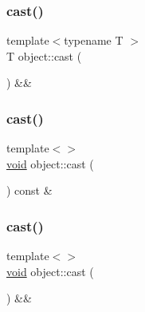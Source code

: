 \subsubsection{\texorpdfstring{cast()}{cast()}\hspace{0.1cm}{\footnotesize\ttfamily [4/6]}}
{\footnotesize\ttfamily template$<$typename T $>$ \\
T object\+::cast (\begin{DoxyParamCaption}{ }\end{DoxyParamCaption}) \&\&}

\mbox{\label{classobject_a4f5464fb468d2c0603780a7e3f4a2e80}} 
\subsubsection{\texorpdfstring{cast()}{cast()}\hspace{0.1cm}{\footnotesize\ttfamily [5/6]}}
{\footnotesize\ttfamily template$<$$>$ \\
\mbox{\hyperlink{_s_d_l__opengles2__gl2ext_8h_ae5d8fa23ad07c48bb609509eae494c95}{void}} object\+::cast (\begin{DoxyParamCaption}{ }\end{DoxyParamCaption}) const \&\hspace{0.3cm}{\ttfamily [inline]}}

\mbox{\label{classobject_a7646c5ad0fba1cd9c20329807678627c}} 
\subsubsection{\texorpdfstring{cast()}{cast()}\hspace{0.1cm}{\footnotesize\ttfamily [6/6]}}
{\footnotesize\ttfamily template$<$$>$ \\
\mbox{\hyperlink{_s_d_l__opengles2__gl2ext_8h_ae5d8fa23ad07c48bb609509eae494c95}{void}} object\+::cast (\begin{DoxyParamCaption}{ }\end{DoxyParamCaption}) \&\&\hspace{0.3cm}{\ttfamily [inline]}}

\mbox{\label{classobject_a77c0e831678400d37745600204f85e14}} 
